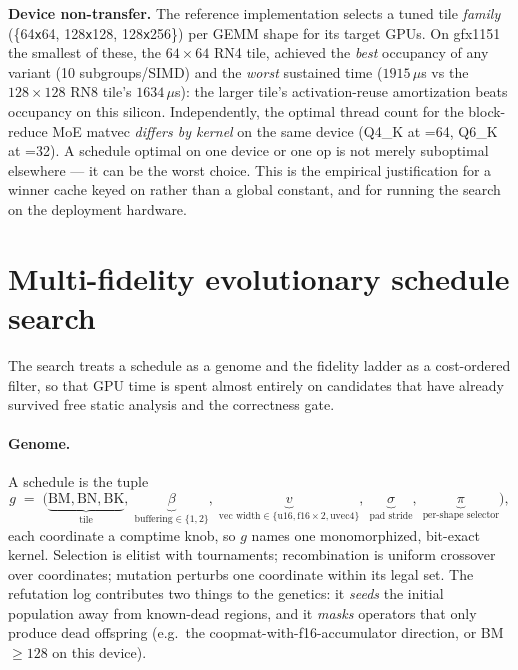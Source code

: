 \documentclass[11pt]{article}
\begin{document}
\textbf{Device non-transfer.} The reference implementation selects a tuned tile \emph{family}
(\{64{\texttt{x}}64, 128{\texttt{x}}128, 128{\texttt{x}}256\}) per GEMM shape for its target GPUs. On gfx1151
the smallest of these, the $64{\times}64$ RN4 tile, achieved the \emph{best} occupancy of any variant (10
subgroups/SIMD) and the \emph{worst} sustained time ($1915\,\mu$s vs the $128{\times}128$ RN8 tile's
$1634\,\mu$s): the larger tile's activation-reuse amortization beats occupancy on this silicon. Independently,
the optimal thread count for the block-reduce MoE matvec \emph{differs by kernel} on the same device (Q4\_K at
=64, Q6\_K at =32). A schedule optimal on one device or one op is not merely suboptimal
elsewhere --- it can be the worst choice. This is the empirical justification for a winner cache keyed on
 rather than a global constant, and for running the search on the deployment
hardware.

\section{Multi-fidelity evolutionary schedule search}
\label{sec:algorithm}

The search treats a schedule as a genome and the fidelity ladder as a cost-ordered filter, so that GPU time
is spent almost entirely on candidates that have already survived free static analysis and the correctness
gate.

\paragraph{Genome.} A schedule is the tuple
\[
g \;=\; \bigl(\underbrace{\mathrm{BM},\mathrm{BN},\mathrm{BK}}_{\text{tile}},\;
\underbrace{\beta}_{\text{buffering}\in\{1,2\}},\;
\underbrace{v}_{\text{vec width}\in\{\mathrm{u16},\mathrm{f16{\times}2},\mathrm{uvec4}\}},\;
\underbrace{\sigma}_{\text{pad stride}},\;
\underbrace{\pi}_{\text{per-shape selector}}\bigr),
\]
each coordinate a comptime knob, so $g$ names one monomorphized, bit-exact kernel. Selection is elitist with
tournaments; recombination is uniform crossover over coordinates; mutation perturbs one coordinate within its
legal set. The refutation log contributes two things to the genetics: it \emph{seeds} the initial population
away from known-dead regions, and it \emph{masks} operators that only produce dead offspring (e.g.\ the
coopmat-with-f16-accumulator direction, or BM${\ge}128$ on this device).
\end{document}
